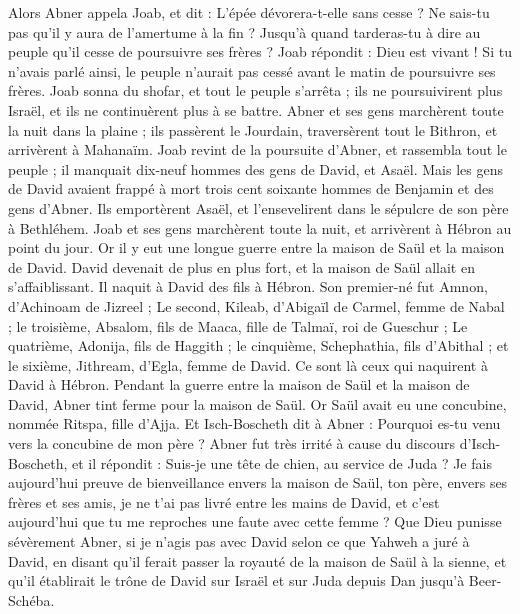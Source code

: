\begin{multicols}{2}
Alors Abner appela Joab, et dit : L'épée dévorera-t-elle sans cesse ? Ne sais-tu pas qu’il y aura de l'amertume à la fin ? Jusqu’à quand tarderas-tu à dire au peuple qu'il cesse de poursuivre ses frères ?
Joab répondit : Dieu est vivant ! Si tu n’avais parlé ainsi, le peuple n’aurait pas cessé avant le matin de poursuivre ses frères.
Joab sonna du shofar, et tout le peuple s'arrêta ; ils ne poursuivirent plus Israël, et ils ne continuèrent plus à se battre.
Abner et ses gens marchèrent toute la nuit dans la plaine ; ils passèrent le Jourdain, traversèrent tout le Bithron, et arrivèrent à Mahanaïm.
Joab revint de la poursuite d'Abner, et rassembla tout le peuple ; il manquait dix-neuf hommes des gens de David, et Asaël.
Mais les gens de David avaient frappé à mort trois cent soixante hommes de Benjamin et des gens d'Abner.
Ils emportèrent Asaël, et l'ensevelirent dans le sépulcre de son père à Bethléhem. Joab et ses gens marchèrent toute la nuit, et arrivèrent à Hébron au point du jour.
\VerseOne{}Or il y eut une longue guerre entre la maison de Saül et la maison de David. David devenait de plus en plus fort, et la maison de Saül allait en s’affaiblissant.
Il naquit à David des fils à Hébron. Son premier-né fut Amnon, d'Achinoam de Jizreel ;
Le second, Kileab, d'Abigaïl de Carmel, femme de Nabal ; le troisième, Absalom, fils de Maaca, fille de Talmaï, roi de Gueschur ;
Le quatrième, Adonija, fils de Haggith ; le cinquième, Schephathia, fils d'Abithal ;
et le sixième, Jithream, d'Egla, femme de David. Ce sont là ceux qui naquirent à David à Hébron.
Pendant la guerre entre la maison de Saül et la maison de David, Abner tint ferme pour la maison de Saül.
Or Saül avait eu une concubine, nommée Ritspa, fille d'Ajja. Et Isch-Boscheth dit à Abner : Pourquoi es-tu venu vers la concubine de mon père ?
Abner fut très irrité à cause du discours d'Isch-Boscheth, et il répondit : Suis-je une tête de chien, au service de Juda ? Je fais aujourd'hui preuve de bienveillance envers la maison de Saül, ton père, envers ses frères et ses amis, je ne t'ai pas livré entre les mains de David, et c'est aujourd'hui que tu me reproches une faute avec cette femme ?
Que Dieu punisse sévèrement Abner, si je n'agis pas avec David selon ce que Yahweh a juré à David,
en disant qu’il ferait passer la royauté de la maison de Saül à la sienne, et qu’il établirait le trône de David sur Israël et sur Juda depuis Dan jusqu'à Beer-Schéba.

\end{multicols}
